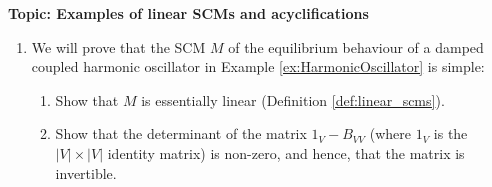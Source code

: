 
\flushleft\textbf{Topic: Examples of linear SCMs and acyclifications}

\begin{enumerate}[label=11.\arabic*]
	\item %
	We will prove that the SCM $M$ of the equilibrium behaviour of a damped coupled harmonic oscillator in Example \ref*{ex:HarmonicOscillator} is simple:

	\begin{enumerate}
		\item Show that $M$ is essentially linear (Definition \ref*{def:linear_scms}).
		\item \label{eq:tridiag} Show that the determinant of the matrix $1_{V}-B_{VV}$ (where $1_V$ is the $|V|\times |V|$ identity matrix) is non-zero, and hence, that the matrix is invertible.


\end{enumerate}
\end{enumerate}
